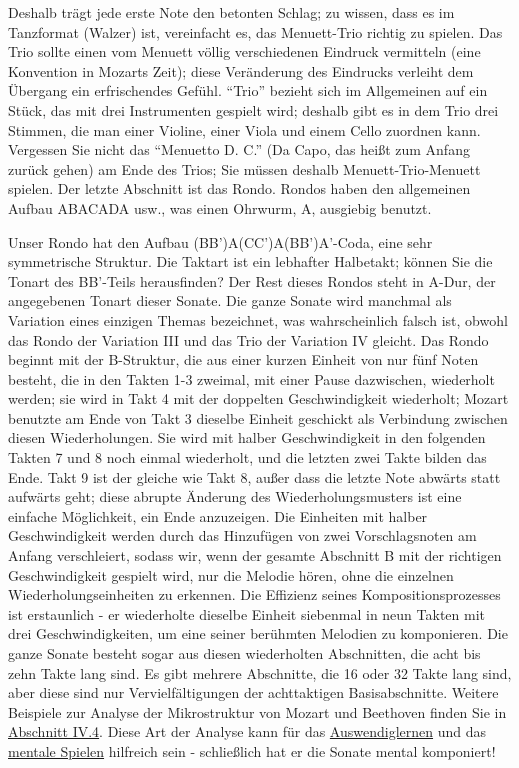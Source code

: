 Deshalb trägt jede erste Note den betonten Schlag; zu wissen, dass es im Tanzformat (Walzer) ist, vereinfacht es, das Menuett-Trio richtig zu spielen.
Das Trio sollte einen vom Menuett völlig verschiedenen Eindruck vermitteln (eine Konvention in Mozarts Zeit); diese Veränderung des Eindrucks verleiht dem Übergang ein erfrischendes Gefühl.
\enquote{Trio} bezieht sich im Allgemeinen auf ein Stück, das mit drei Instrumenten gespielt wird; deshalb gibt es in dem Trio drei Stimmen, die man einer Violine, einer Viola und einem Cello zuordnen kann.
Vergessen Sie nicht das \enquote{Menuetto D. C.} (Da Capo, das heißt zum Anfang zurück gehen) am Ende des Trios; Sie müssen deshalb Menuett-Trio-Menuett spielen.
Der letzte Abschnitt ist das Rondo.
Rondos haben den allgemeinen Aufbau ABACADA usw., was einen Ohrwurm, A, ausgiebig benutzt.


Unser Rondo hat den Aufbau (BB')A(CC')A(BB')A'-Coda, eine sehr symmetrische Struktur.
Die Taktart ist ein lebhafter Halbetakt; können Sie die Tonart des BB'-Teils herausfinden?
Der Rest dieses Rondos steht in A-Dur, der angegebenen Tonart dieser Sonate.
Die ganze Sonate wird manchmal als Variation eines einzigen Themas bezeichnet, was wahrscheinlich falsch ist, obwohl das Rondo 
der Variation III und das Trio der Variation IV gleicht.
Das Rondo beginnt mit der B-Struktur, die aus einer kurzen Einheit von nur fünf Noten besteht, die in den Takten 1-3 zweimal, mit einer Pause dazwischen, wiederholt werden; sie wird in Takt 4 mit der doppelten Geschwindigkeit wiederholt; Mozart benutzte am Ende von Takt 3 dieselbe Einheit geschickt als Verbindung zwischen diesen Wiederholungen.
Sie wird mit halber Geschwindigkeit in den folgenden Takten 7 und 8 noch einmal wiederholt, und die letzten zwei Takte bilden das Ende.
Takt 9 ist der gleiche wie Takt 8, außer dass die letzte Note abwärts statt aufwärts geht; diese abrupte Änderung des Wiederholungsmusters ist eine einfache Möglichkeit, ein Ende anzuzeigen.
Die Einheiten mit halber Geschwindigkeit werden durch das Hinzufügen von zwei Vorschlagsnoten am Anfang verschleiert, sodass wir, wenn der gesamte Abschnitt B mit der richtigen Geschwindigkeit gespielt wird, nur die Melodie hören, ohne die einzelnen Wiederholungseinheiten zu erkennen.
Die Effizienz seines Kompositionsprozesses ist erstaunlich - er wiederholte dieselbe Einheit siebenmal in neun Takten mit drei Geschwindigkeiten, um eine seiner berühmten Melodien zu komponieren.
Die ganze Sonate besteht sogar aus diesen wiederholten Abschnitten, die acht bis zehn Takte lang sind.
Es gibt mehrere Abschnitte, die 16 oder 32 Takte lang sind, aber diese sind nur Vervielfältigungen der achttaktigen Basisabschnitte.
Weitere Beispiele zur Analyse der Mikrostruktur von Mozart und Beethoven finden Sie in \hyperlink{c1iv4}{Abschnitt IV.4}.
Diese Art der Analyse kann für das \hyperlink{c1iii6}{Auswendiglernen} und das \hyperlink{c1ii12mental}{mentale Spielen} hilfreich sein - schließlich hat er die Sonate mental komponiert!

